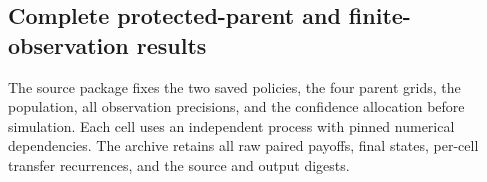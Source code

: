 \subsection{Complete protected-parent and finite-observation results}
\label{app:r15observation}
The source package fixes the two saved policies, the four parent grids, the
population, all observation precisions, and the confidence allocation before
simulation. Each cell uses an independent process with pinned numerical
dependencies. The archive retains all raw paired payoffs, final states,
per-cell transfer recurrences, and the source and output digests.


